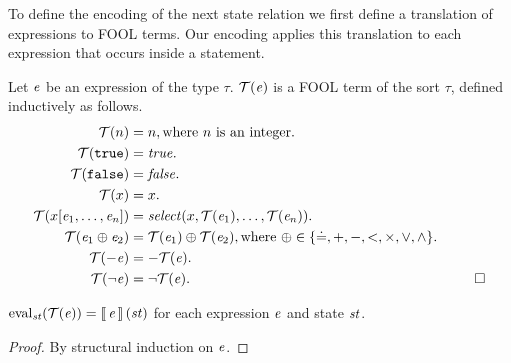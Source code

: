 To define the encoding of the next state relation we first define a translation of expressions to FOOL terms. Our encoding applies this translation to each expression that occurs inside a statement.

\begin{definition}
Let $\mathit{e}$ be an expression of the type $\tau$. $\mathcal{T}({\mathit{e}})$ is a FOOL term of the sort $\tau$, defined inductively as follows.
\[
\begin{aligned}
\translate{n} &= n, \text{where $n$ is an integer}. \\
\translate{\ttrue} &= \true. \\
\translate{\tfalse} &= \false. \\
\translate{x} &= x. \\
\translate{x[\expr_1,\ldots,\expr_n]} &= \select{x}{\translate{\expr_1},\ldots,\translate{\expr_n}}. \\
\translate{\expr_1\oplus\expr_2} &= \translate{\expr_1} \oplus \translate{\expr_2}, \text{where } \oplus \in \{ \eql, +, -, <, \times, \vee, \wedge \}. \\
\translate{-\expr} &= -\translate{\expr}. \\
\translate{\neg\expr} &= \neg\translate{\expr}.\quad\quad\quad\quad\quad\quad\quad\quad\quad\quad\quad\quad\quad\quad\quad\quad\quad\quad\,\,\QED
\end{aligned}
\]
\end{definition}

\begin{lemma}\label{lemma:boogie/transform-expressions}
$\mathrm{eval}_{\mathit{st}}({\mathcal{T}({\mathit{e}})}) = \left\llbracket\,{\mathit{e}}\,\right\rrbracket(\mathit{st})$ for each expression $\mathit{e}$ and state $\mathit{st}$. \QED
\end{lemma}
\begin{proof}
By structural induction on $\mathit{e}$. %
\end{proof}


